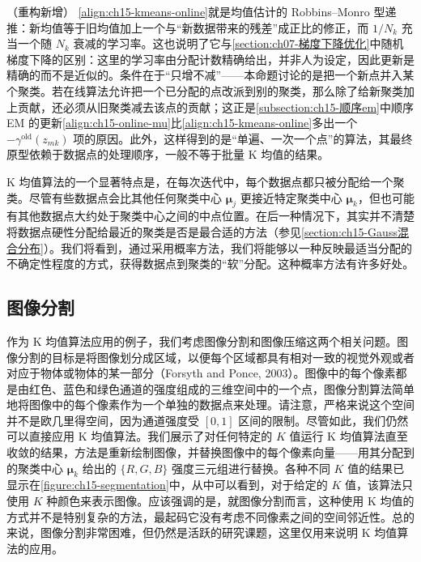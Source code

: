 \documentclass[../../main.tex]{subfiles}
\begin{document}
\begin{remark}（重构新增）
\eqref{align:ch15-kmeans-online}就是均值估计的 Robbins--Monro 型递推：新均值等于旧均值加上一个与“新数据带来的残差”成正比的修正，而 $1/N_k$ 充当一个随 $N_k$ 衰减的学习率。这也说明了它与\cref{section:ch07-梯度下降优化}中随机梯度下降的区别：这里的学习率由分配计数精确给出，并非人为设定，因此更新是精确的而不是近似的。条件在于“只增不减”——本命题讨论的是把一个新点并入某个聚类。若在线算法允许把一个已分配的点改派到别的聚类，那么除了给新聚类加上贡献，还必须从旧聚类减去该点的贡献；这正是\cref{subsection:ch15-顺序em}中顺序 EM 的更新\eqref{align:ch15-online-mu}比\eqref{align:ch15-kmeans-online}多出一个 $-\gamma^{\text{old}}(z_{mk})$ 项的原因。此外，这样得到的是“单遍、一次一个点”的算法，其最终原型依赖于数据点的处理顺序，一般不等于批量 K 均值的结果。
\end{remark}

K 均值算法的一个显著特点是，在每次迭代中，每个数据点都只被分配给一个聚类。尽管有些数据点会比其他任何聚类中心 $\bm{\mu}_j$ 更接近特定聚类中心 $\bm{\mu}_k$，但也可能有其他数据点大约处于聚类中心之间的中点位置。在后一种情况下，其实并不清楚将数据点硬性分配给最近的聚类是否是最合适的方法（参见\cref{section:ch15-Gauss混合分布}）。我们将看到，通过采用概率方法，我们将能够以一种反映最适当分配的不确定性程度的方式，获得数据点到聚类的“软”分配。这种概率方法有许多好处。

\subsection*{图像分割}

作为 K 均值算法应用的例子，我们考虑图像分割和图像压缩这两个相关问题。图像分割的目标是将图像划分成区域，以便每个区域都具有相对一致的视觉外观或者对应于物体或物体的某一部分（Forsyth and Ponce, 2003）。图像中的每个像素都是由红色、蓝色和绿色通道的强度组成的三维空间中的一个点，图像分割算法简单地将图像中的每个像素作为一个单独的数据点来处理。请注意，严格来说这个空间并不是欧几里得空间，因为通道强度受 $[0,1]$ 区间的限制。尽管如此，我们仍然可以直接应用 K 均值算法。我们展示了对任何特定的 $K$ 值运行 K 均值算法直至收敛的结果，方法是重新绘制图像，并替换图像中的每个像素向量——用其分配到的聚类中心 $\bm{\mu}_k$ 给出的 $\{R,G,B\}$ 强度三元组进行替换。各种不同 $K$ 值的结果已显示在\cref{figure:ch15-segmentation}中，从中可以看到，对于给定的 $K$ 值，该算法只使用 $K$ 种颜色来表示图像。应该强调的是，就图像分割而言，这种使用 K 均值的方式并不是特别复杂的方法，最起码它没有考虑不同像素之间的空间邻近性。总的来说，图像分割非常困难，但仍然是活跃的研究课题，这里仅用来说明 K 均值算法的应用。
\end{document}
